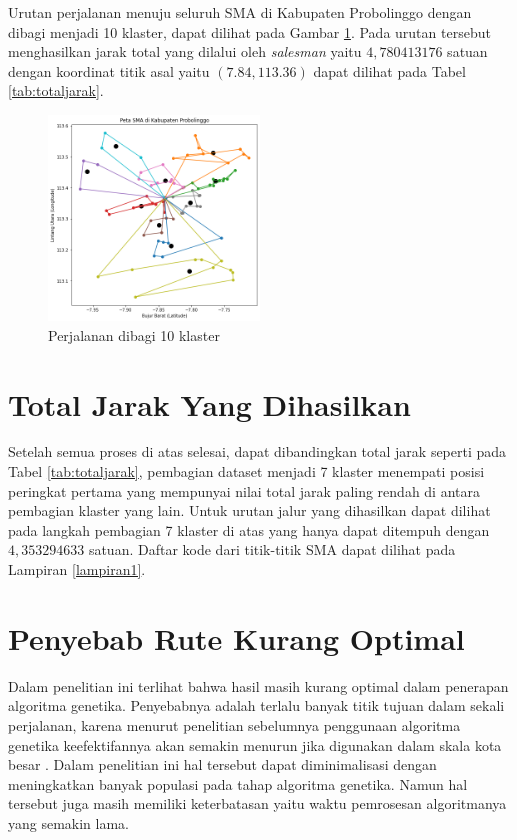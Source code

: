 Urutan perjalanan menuju seluruh SMA di Kabupaten Probolinggo dengan dibagi menjadi 10 klaster, dapat dilihat pada Gambar \ref{fig:hasil_mtsp10}. Pada urutan tersebut menghasilkan jarak total yang dilalui oleh \textit{salesman} yaitu $4,780413176$ satuan dengan koordinat titik asal yaitu $(7.84, 113.36)$ dapat dilihat pada Tabel \ref{tab:totaljarak}.

\begin{figure}[H]
\centering
\includegraphics[width=0.5\textwidth]{Gambar/hasil_mtsp/10}
\caption{Perjalanan dibagi 10 klaster}
\label{fig:hasil_mtsp10}
\end{figure}

\section{Total Jarak Yang Dihasilkan}
Setelah semua proses di atas selesai, dapat dibandingkan total jarak seperti pada Tabel \ref{tab:totaljarak}, pembagian dataset  menjadi 7 klaster menempati posisi peringkat pertama yang mempunyai nilai total jarak paling rendah di antara pembagian klaster yang lain. Untuk urutan jalur yang dihasilkan dapat dilihat pada langkah pembagian 7 klaster di atas yang hanya dapat ditempuh dengan $4,353294633$ satuan. Daftar kode dari titik-titik SMA dapat dilihat pada Lampiran \ref{lampiran1}.



\section{Penyebab Rute Kurang Optimal}

Dalam penelitian ini terlihat bahwa hasil masih kurang optimal dalam penerapan algoritma genetika. Penyebabnya adalah terlalu banyak titik tujuan dalam sekali perjalanan, karena menurut penelitian sebelumnya penggunaan algoritma genetika keefektifannya akan semakin menurun jika digunakan dalam skala kota besar \cite{inproceedings}. Dalam penelitian ini hal tersebut dapat diminimalisasi dengan meningkatkan banyak populasi pada tahap algoritma genetika. Namun hal tersebut juga masih memiliki keterbatasan yaitu waktu pemrosesan algoritmanya yang semakin lama.